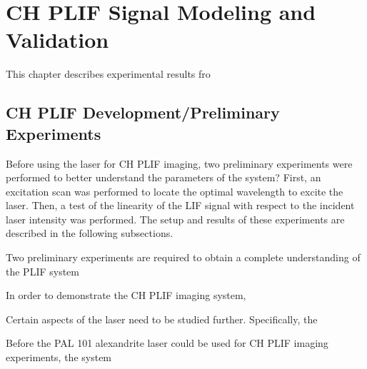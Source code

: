 \chapter{CH PLIF Signal Modeling and Validation}





This chapter describes experimental results fro


\section{CH PLIF Development/Preliminary Experiments}

Before using the laser for CH PLIF imaging, two preliminary experiments were performed to better understand the parameters of the system?
First, an excitation scan was performed to locate the optimal wavelength to excite the laser.
Then, a test of the linearity of the LIF signal with respect to the incident laser intensity was performed.
The setup and results of these experiments are described in the following subsections.



Two preliminary experiments are required to obtain a complete understanding of the PLIF system


In order to demonstrate the CH PLIF imaging system, 

Certain aspects of the laser need to be studied further.
Specifically, the 

Before the PAL 101 alexandrite laser could be used for CH PLIF imaging experiments, the system

